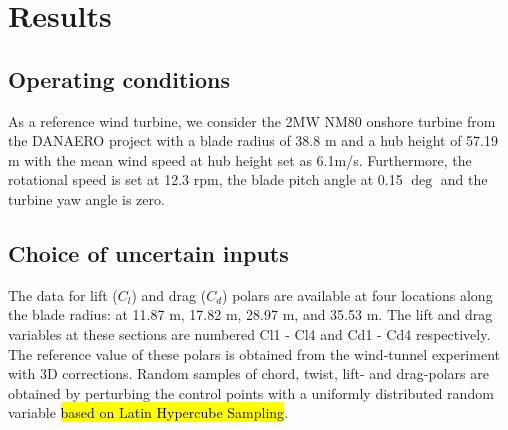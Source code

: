 

\section{Results}\label{sec:results}

\subsection{Operating conditions}
As a reference wind turbine, we consider the 2MW NM80 onshore turbine from the DANAERO project \cite{Troldborg2013} with a blade radius of 38.8 m and a hub height of 57.19 m with the mean wind speed at hub height set as 6.1m/s. Furthermore, the rotational speed is set at 12.3 rpm, the blade pitch angle at 0.15 $\deg$ and the turbine yaw angle is zero.

\subsection{Choice of uncertain inputs}
The data for lift ($C_l$) and drag ($C_d$) polars are available at four locations along the blade radius: at 11.87 m, 17.82 m, 28.97 m, and 35.53 m. The lift and drag variables at these sections are numbered Cl1 - Cl4 and Cd1 - Cd4 respectively. The reference value of these polars is obtained from the wind-tunnel experiment with 3D corrections. Random samples of chord, twist, lift- and drag-polars are obtained by perturbing the control points with a uniformly distributed random variable \hl{based on Latin Hypercube Sampling}.  

